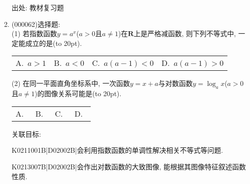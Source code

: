 \documentclass[10pt,a4paper]{article}
\newcommand{\bracket}[1]{(\hbox to #1pt{})}
\newcommand{\fourch}[4]{\par\begin{tabular}{p{.23\textwidth}p{.23\textwidth}p{.23\textwidth}p{.23\textwidth}}
A.~#1 &B.~#2& C.~#3& D.~#4
\end{tabular}}
\begin{document}
\begin{enumerate}[1.]
出处: 教材复习题
\item { (000062)}选择题:\\
(1) 若指数函数$y=a^x$($a>0$且$a\ne 1$)在$\mathbf{R}$上是严格减函数, 则下列不等式中, 一定能成立的是\bracket{20}.
\fourch{$a>1$}{$a<0$}{$a(a-1)<0$}{$a(a-1)>0$}
(2) 在同一平面直角坐标系中, 一次函数$y=x+a$与对数函数$y=\log_ax$($a>0$且$a\ne 1$)的图像关系可能是\bracket{20}.
\fourch{\begin{tikzpicture}[scale = 0.5,>=latex]
    \draw [->] (-2,0) -- (3,0) node [below] {$x$};
    \draw [->] (0,-2) -- (0,3) node [left] {$y$};
    \draw (0,0) node [below left] {$O$};
    \draw (0.1,1) -- (0,1) node [left] {$1$};
    \draw (1,0) node [below] {$1$};
    \draw [thick] (-2,-0.3) -- (1.3,3);
    \draw [thick,domain =-1.1:2.1,samples = 200] plot ({0.5^\x},\x);
\end{tikzpicture}
}{\begin{tikzpicture}[scale = 0.5,>=latex]
    \draw [->] (-2,0) -- (3,0) node [below] {$x$};
    \draw [->] (0,-2) -- (0,3) node [left] {$y$};
    \draw (0,0) node [below left] {$O$};
    \draw (0.1,1) -- (0,1) node [left] {$1$};
    \draw (1,0) node [below] {$1$};
    \draw [thick] (-2,-1.5) -- (2.5,3);
    \draw [thick,domain =1.5:-1.5,samples = 200] plot ({0.5^\x},-\x);
\end{tikzpicture}
}{\begin{tikzpicture}[scale = 0.5,>=latex]
    \draw [->] (-2,0) -- (3,0) node [below] {$x$};
    \draw [->] (0,-2) -- (0,3) node [left] {$y$};
    \draw (0,0) node [below left] {$O$};
    \draw (0.1,1) -- (0,1) node [left] {$1$};
    \draw (1,0) node [below] {$1$};
    \draw [thick] (-2,-1.5) -- (2.5,3);
    \draw [thick,domain =-1.1:2.1,samples = 200] plot ({0.5^\x},\x);
\end{tikzpicture}
}{\begin{tikzpicture}[scale = 0.5,>=latex]
    \draw [->] (-2,0) -- (3,0) node [below] {$x$};
    \draw [->] (0,-2) -- (0,3) node [left] {$y$};
    \draw (0,0) node [below left] {$O$};
    \draw (0.1,1) -- (0,1) node [left] {$1$};
    \draw (1,0) node [below] {$1$};
    \draw [thick] (-1.5,-2) -- (3,2.5);
    \draw [thick,domain =1.5:-1.5,samples = 200] plot ({0.5^\x},-\x);
\end{tikzpicture}
}


关联目标:

K0211001B|D02002B|会利用指数函数的单调性解决相关不等式等问题.

K0213007B|D02002B|会作出对数函数的大致图像, 能根据其图像特征叙述函数性质.




\end{enumerate}
\end{document}

